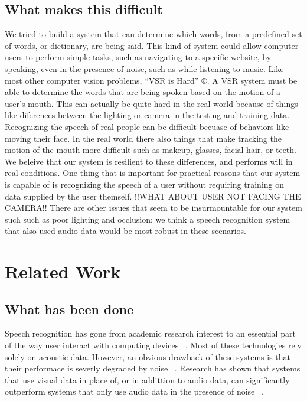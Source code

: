\documentclass[10pt,twocolumn,letterpaper]{article}
\begin{document}
\subsection{What makes this difficult}
We tried to build a system that can determine which words, from a predefined set of words, or dictionary, are being said.
This kind of system could allow computer users to perform simple tasks, such as navigating to a specific website, by speaking, even in the presence of noise, such as while listening to music.
Like most other computer vision problems, ``VSR is Hard'' ©.
A VSR system must be able to determine the words that are being spoken based on the motion of a user's mouth.
This can actually be quite hard in the real world because of things like diferences between the lighting or camera in the testing and training data.
Recognizing the speech of real people can be difficult becuase of behaviors like moving their face.
In the real world there also things that make tracking the motion of the mouth more difficult such as makeup, glasses, facial hair, or teeth.
We beleive that our system is resilient to these differences, and performs will in real conditions.
One thing that is important for practical reasons that our system is capable of is recognizing the speech of a user without requiring training on data supplied by the user themself.
!!WHAT ABOUT USER NOT FACING THE CAMERA!!
There are other issues that seem to be insurmountable for our system such such as poor lighting and occlusion; we think a speech recognition system that also used audio data would be most robust in these scenarios.


\section{Related Work}
\subsection{What has been done}
Speech recognition has gone from academic research interest to an essential part of the way user interact with computing devices ~\cite{Lison:2014:SDS:2677339.2659891}.
Most of these technologies rely solely on acoustic data. However, an obvious drawback of these systems is that their performace is severly degraded by noise ~\cite{Cooke2001267}. Research has shown that systems that use visual data in place of, or in addittion to audio data, can significantly outperform systems that only use audio data in the presence of noise ~\cite{Lison:2014:SDS:2677339.2659891}.
\end{document}
